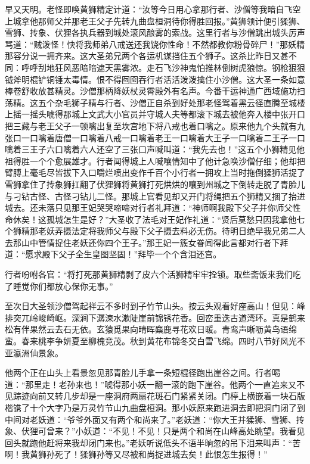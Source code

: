 \documentclass[12pt,UTF8]{ctexbook}
\begin{document}
{	早又天明。老怪即唤黄狮精定计道：“汝等今日用心拿那行者、沙僧等我暗自飞空上城拿他那师父并那老王父子先转九曲盘桓洞待你得胜回报。”黄狮领计便引猱狮、雪狮、抟象、伏狸各执兵器到城处滚风酿雾的索战。这里行者与沙僧跳出城头厉声骂道：“贼泼怪！快将我师弟八戒送还我饶你性命！不然都教你粉骨碎尸！”那妖精那容分说一拥齐来。这大圣弟兄两个各运机谋挡住五个狮子。这杀比昨日又甚不同：呼呼刮地狂风恶暗暗遮天黑雾浓。走石飞沙神鬼怕推林倒树虎狼惊。钢枪狠狠钺斧明棍铲铜锤太毒情。恨不得囫囵吞行者活活泼泼擒住小沙僧。这大圣一条如意棒卷舒收放甚精灵。沙僧那柄降妖杖灵霄殿外有名声。今番干运神通广西域施功扫荡精。这五个杂毛狮子精与行者、沙僧正自杀到好处那老怪驾着黑云径直腾至城楼上摇一摇头唬得那城上文武大小官员并守城人夫等都滚下城去被他奔入楼中张开口把三藏与老王父子一顿噙出复至坎宫地下将八戒也着口噙之。原来他九个头就有九张口一口噙着唐僧一口噙着八戒一口噙着老王一口噙着大王子一口噙着二王子一口噙着三王子六口噙着六人还空了三张口声喊叫道：“我先去也！”这五个小狮精见他祖得胜一个个愈展雄才。行者闻得城上人喊嚷情知中了他计急唤沙僧仔细；他却把臂膊上毫毛尽皆拔下入口嚼烂喷出变作千百个小行者一拥攻上当时拖倒猱狮活捉了雪狮拿住了抟象狮扛翻了伏狸狮将黄狮打死烘烘的嚷到州城之下倒转走脱了青脸儿与刁钻古怪、古怪刁钻儿二怪。那城上官看见却又开门将绳把五个狮精又捆了抬进城去。还未落只见那王妃哭哭啼啼对行者礼拜道：“神师啊我殿下父子并你师父性命休矣！这孤城怎生是好？”大圣收了法毛对王妃作礼道：“贤后莫愁只因我拿他七个狮精那老妖弄摄法定将我师父与殿下父子摄去料必无伤。待明日绝早我兄弟二人去那山中管情捉住老妖还你四个王子。”那王妃一簇女眷闻得此言都对行者下拜道：“愿求殿下父子全生皇图坚固！”拜毕一个个含泪还宫。
	
	行者吩咐各官：“将打死那黄狮精剥了皮六个活狮精牢牢拴锁。取些斋饭来我们吃了睡觉你们都放心保你无事。”
	
	至次日大圣领沙僧驾起祥云不多时到子竹节山头。按云头观看好座高山！但见：峰排突兀岭峻崎岖。深涧下潺湅水漱陡崖前锦锈花香。回峦重迭古道湾环。真是鹤来松有伴果然云去石无依。玄猿觅果向晴晖麋鹿寻花欢日暖。青鸾声晰呖黄鸟语绵蛮。春来桃李争妍夏至柳槐竞茂。秋到黄花布锦冬交白雪飞绵。四时八节好风光不亚瀛洲仙景象。
	
	他两个正在山头上看景忽见那青脸儿手拿一条短棍径跑出崖谷之间。行者喝道：“那里走！老孙来也！”唬得那小妖一翻一滚的跑下崖谷。他两个一直追来又不见踪迹向前又转几步却是一座洞府两扇花斑石门紧紧关闭。门楟上横嵌着一块石版楷镌了十个大字乃是万灵竹节山九曲盘桓洞。那小妖原来跑进洞去即把洞门闭了到中间对老妖道：“爷爷外面又有两个和尚来了。”老妖道：“你大王并猱狮、雪狮、抟象、伏狸可曾来？”小妖道：“不见！不见！只是两个和尚在山峰高处眺望。我看见回头就跑他赶将来我却闭门来也。”老妖听说低头不语半晌忽的吊下泪来叫声：“苦啊！我黄狮孙死了！猱狮孙等又尽被和尚捉进城去矣！此恨怎生报得！”
	
}
\end{document}
